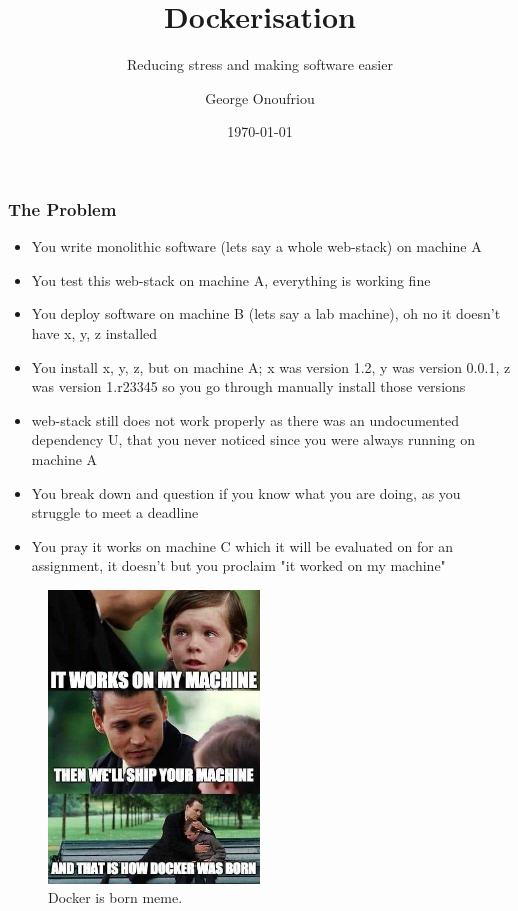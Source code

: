 \documentclass[aspectratio=169]{beamer}
\title{Dockerisation}
\subtitle{Reducing stress and making software easier}
\author{George Onoufriou}
\date{\today}
\begin{document}
  \frame{\titlepage}

  \begin{frame}
    \frametitle{The Problem}
    \begin{itemize}
        \item You write monolithic software (lets say a whole web-stack) on machine A
        \item You test this web-stack on machine A, everything is working fine
        \item You deploy software on machine B (lets say a lab machine), oh no it doesn't have x, y, z installed
        \item You install x, y, z, but on machine A; x was version 1.2, y was version 0.0.1, z was version 1.r23345 so you go through manually install those versions
        \item web-stack still does not work properly as there was an undocumented dependency U, that you never noticed since you were always running on machine A
        \item You break down and question if you know what you are doing, as you struggle to meet a deadline
        \item You pray it works on machine C which it will be evaluated on for an assignment, it doesn't but you proclaim "it worked on my machine"
    \end{itemize}
  \end{frame}

  \begin{frame}
    \begin{figure}[th!]
      \centering
      \includegraphics[width=0.5\textwidth]{docker-is-born-meme.jpg}
      \caption{Docker is born meme.}
      \label{fig:docker_born}
    \end{figure}
  \end{frame}
\end{document}
